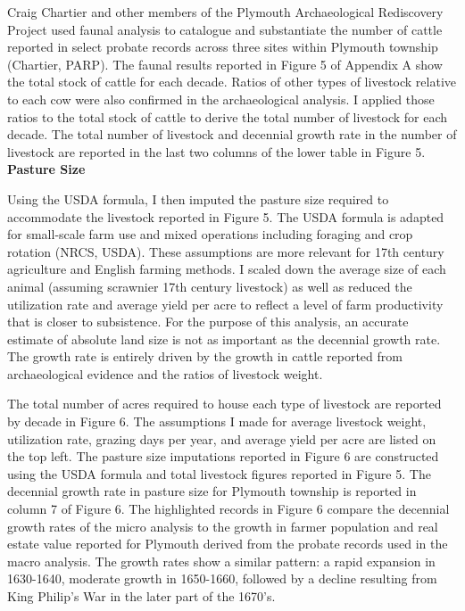 \documentclass[11pt, oneside]{article}
\begin{document}
Craig Chartier and other members of the Plymouth Archaeological Rediscovery Project used faunal analysis to catalogue and substantiate the number of cattle reported in select probate records across three sites within Plymouth township (Chartier, PARP). The faunal results reported in Figure 5 of Appendix A show the total stock of cattle for each decade. Ratios of other types of livestock relative to each cow were also confirmed in the archaeological analysis. I applied those ratios to the total stock of cattle to derive the total number of livestock for each decade. The total number of livestock and decennial growth rate in the number of livestock are reported in the last two columns of the lower table in Figure 5.
\\

\noindent\textbf{Pasture Size}

Using the USDA formula, I then imputed the pasture size required to accommodate the livestock reported in Figure 5. The USDA formula is adapted for small-scale farm use and mixed operations including foraging and crop rotation (NRCS, USDA). These assumptions are more relevant for 17th century agriculture and English farming methods. I scaled down the average size of each animal (assuming scrawnier 17th century livestock) as well as reduced the utilization rate and average yield per acre to reflect a level of farm productivity that is closer to subsistence. For the purpose of this analysis, an accurate estimate of absolute land size is not as important as the decennial growth rate. The growth rate is entirely driven by the growth in cattle reported from archaeological evidence and the ratios of livestock weight.

The total number of acres required to house each type of livestock are reported by decade in Figure 6. The assumptions I made for average livestock weight, utilization rate, grazing days per year, and average yield per acre are listed on the top left. The pasture size imputations reported in Figure 6 are constructed using the USDA formula and total livestock figures reported in Figure 5. The decennial growth rate in pasture size for Plymouth township is reported in column 7 of Figure 6. The highlighted records in Figure 6 compare the decennial growth rates of the micro analysis to the growth in farmer population and real estate value reported for Plymouth derived from the probate records used in the macro analysis. The growth rates show a similar pattern:  a rapid expansion in 1630-1640, moderate growth in 1650-1660, followed by a decline resulting from King Philip's War in the later part of the 1670's.
\end{document}
